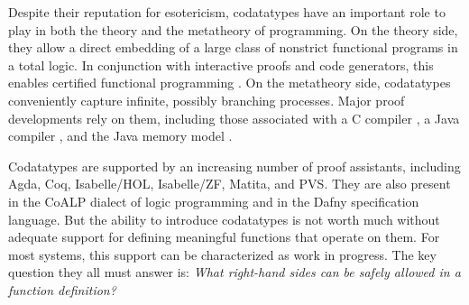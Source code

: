 \documentclass[preprint,draft]
{sigplanconf}
\newcommand{\leftOut}[1]{}
\newcommand{\<}{\langle}
\renewcommand{\>}{\rangle}
\begin{document}
Despite their reputation for esotericism, codatatypes have an
important role to play in both the theory and the metatheory of programming. On
the theory side, they allow a direct embedding of a large class of
nonstrict functional programs in a total logic. In conjunction
with interactive proofs and code generators, this enables certified functional programming \cite{benton-integrated}.
On the metatheory side, codatatypes conveniently capture infinite, possibly
branching processes. Major proof developments rely on them, including those
associated with a C compiler \cite{leroy-2009}, a Java compiler
\cite{lochbihler-2010-jinja}, and the Java memory model
\cite{lochbihler-2014-jmm}.
\leftOut{Beyond
programming, a number of papers illustrate how coinductive methods can lead to
more elegant solutions than traditional approaches. A recent instance is a formal proof
of the completeness theorem for classical first-order logic
\cite{blanchette-et-al-2014-compl}, failed attempts at finding a proof give rise to
based on possibly infinite derivation trees.}

\newcommand\NOCITE[1]{}

Codatatypes are supported by an increasing number of proof assistants, including
Agda\NOCITE{bove-et-al-2009}, Coq\NOCITE{bertot-casteran-2004},
Isabelle\slash HOL\NOCITE{nipkow-et-al-2002},
Isabelle\slash ZF\NOCITE{paulson-1993-zf,paulson-1995-zf}, Matita\NOCITE{asperti-et-al-2011},
and PVS\NOCITE{crow-et-al-1995}. They are also present in
the CoALP dialect of logic programming\NOCITE{heras-et-al-201x} and in
the Dafny specification language\NOCITE{leino-moskal-2014}.
But the ability to introduce codatatypes is not worth much without adequate support
for defining meaningful functions that operate on them. For most systems, this support
can be characterized as work in progress. The key question they all must answer is:
\emph{What right-hand sides can be safely allowed in a function definition?}
\end{document}
